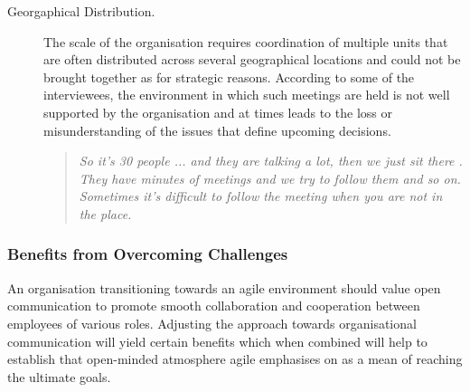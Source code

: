 \begin{description}
   \item[Georgaphical Distribution.] The scale of the organisation requires coordination of multiple units that are often distributed across several geographical locations and could not be brought together as for strategic reasons. According to some of the interviewees, the environment in which such meetings are held is not well supported by the organisation and at times leads to the loss or misunderstanding of the issues that define upcoming decisions.
   
      \begin{quote}\itshape So it’s 30 people ... and they are talking a lot, then we just sit there . They have minutes of meetings and we try to follow them and so on. Sometimes it’s difficult to follow the meeting when you are not in the place.
      \end{quote}

\end{description}

\subsubsection{Benefits from Overcoming Challenges}

An organisation transitioning towards an agile environment should value open communication to promote smooth collaboration and cooperation between employees of various roles. Adjusting the approach towards organisational communication will yield certain benefits which when combined will help to establish that open-minded atmosphere agile emphasises on as a mean of reaching the ultimate goals.

